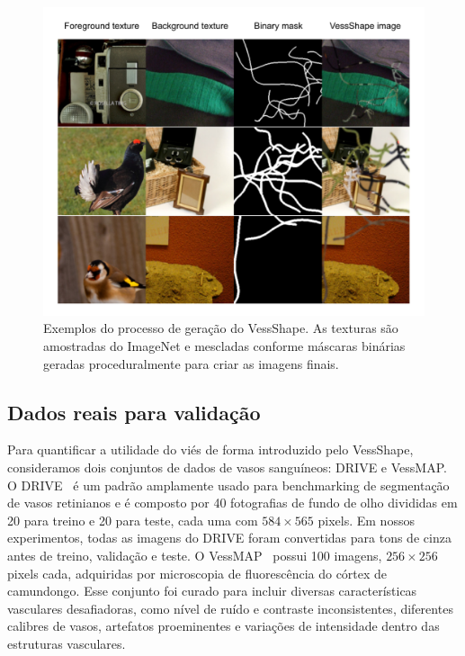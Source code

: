 \documentclass[%
reprint,
nofootinbib,
 amsmath,amssymb,
aps,
floatfix,
superscriptaddress,
showkeys,
longbibliography
]{revtex4-1}
\begin{document}
\begin{figure}[tbp]
    \centering
    \includegraphics[width=\columnwidth]{figures/results/vessshape_sample.pdf}
    \caption{Exemplos do processo de geração do VessShape. As texturas são amostradas do ImageNet e mescladas conforme máscaras binárias geradas proceduralmente para criar as imagens finais.}
    \label{f:vessshape_sample}
\end{figure}

\subsection{Dados reais para validação}

Para quantificar a utilidade do viés de forma introduzido pelo VessShape, consideramos dois conjuntos de dados de vasos sanguíneos: DRIVE e VessMAP. O DRIVE~\cite{Staal2004} é um padrão amplamente usado para benchmarking de segmentação de vasos retinianos e é composto por 40 fotografias de fundo de olho divididas em 20 para treino e 20 para teste, cada uma com $584\times565$ pixels. Em nossos experimentos, todas as imagens do DRIVE foram convertidas para tons de cinza antes de treino, validação e teste. O VessMAP~\cite{viana2025new} possui 100 imagens, $256\times256$ pixels cada, adquiridas por microscopia de fluorescência do córtex de camundongo. Esse conjunto foi curado para incluir diversas características vasculares desafiadoras, como nível de ruído e contraste inconsistentes, diferentes calibres de vasos, artefatos proeminentes e variações de intensidade dentro das estruturas vasculares.
\end{document}
